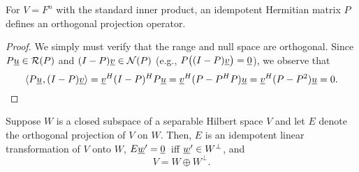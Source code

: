 \begin{theorem}
For $V=F^n$ with the standard inner product, an idempotent Hermitian matrix $P$ defines an orthogonal projection operator.
\end{theorem}
\begin{proof}
We simply must verify that the range and null space are orthogonal.
Since $P \underline{u} \in \mathcal{R}(P)$ and $(I-P) \underline{v} \in \mathcal{N}(P)$ (e.g., $P\big((I-P)\underline{v}\big)=\underline{0}$), we observe that
\[ {\langle  P\underline{u}  \mskip1mu ,  (I-P)\underline{v}  \rangle} = \underline{v}^H (I-P)^H P \underline{u} = \underline{v}^H (P - P^H P) \underline{u} = \underline{v}^H (P - P^2) \underline{u} = 0. \]
\end{proof}

\begin{theorem} \label{theorem:OrthogonalSubspaceDirectSum}
Suppose $W$ is a closed subspace of a separable Hilbert space $V$ and let $E$ denote the orthogonal projection of $V$ on $W$.
Then, $E$ is an idempotent linear transformation of $V$ onto $W$, $E \underline{w}' = \underline{0}\,$ iff $\underline{w}' \in W^{\bot}$, and
\begin{equation*}
V = W \oplus W^{\bot}.
\end{equation*}
\end{theorem}

